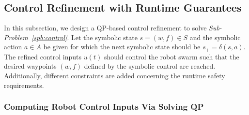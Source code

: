 \documentclass[letterpaper, 10 pt, conference]{ieeeconf}
\begin{document}
 
\subsection{Control Refinement with Runtime Guarantees}
\label{sec:qp}

In this subsection, we design a QP-based control refinement to solve \textit{Sub-Problem~\ref{spb:control}}. Let the symbolic state $ s=(w,f)\in S$ and the symbolic action $a\in A$ be given for which the next symbolic state should be $s_+ = \delta(s,a)$. The refined control inputs $u(t)$ should control the robot swarm such that the desired waypoints $(w,f)$ defined by the symbolic control are reached. Additionally, different constraints are added concerning the runtime safety requirements.

\subsubsection{Computing Robot Control Inputs Via Solving QP}
\end{document}
